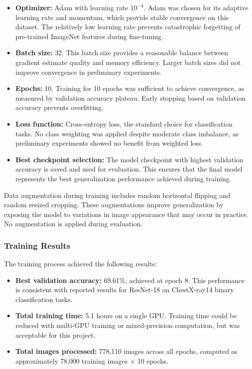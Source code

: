 \documentclass[12pt,a4paper]{article}
\begin{document}
\begin{itemize}[leftmargin=*]
    \item \textbf{Optimizer:} Adam with learning rate $10^{-4}$. Adam was chosen for its adaptive learning rate and momentum, which provide stable convergence on this dataset. The relatively low learning rate prevents catastrophic forgetting of pre-trained ImageNet features during fine-tuning.
    \item \textbf{Batch size:} 32. This batch size provides a reasonable balance between gradient estimate quality and memory efficiency. Larger batch sizes did not improve convergence in preliminary experiments.
    \item \textbf{Epochs:} 10. Training for 10 epochs was sufficient to achieve convergence, as measured by validation accuracy plateau. Early stopping based on validation accuracy prevents overfitting.
    \item \textbf{Loss function:} Cross-entropy loss, the standard choice for classification tasks. No class weighting was applied despite moderate class imbalance, as preliminary experiments showed no benefit from weighted loss.
    \item \textbf{Best checkpoint selection:} The model checkpoint with highest validation accuracy is saved and used for evaluation. This ensures that the final model represents the best generalization performance achieved during training.
\end{itemize}

Data augmentation during training includes random horizontal flipping and random resized cropping. These augmentations improve generalization by exposing the model to variations in image appearance that may occur in practice. No augmentation is applied during evaluation.

\subsubsection{Training Results}

The training process achieved the following results:
\begin{itemize}[leftmargin=*]
    \item \textbf{Best validation accuracy:} 69.61\%, achieved at epoch 8. This performance is consistent with reported results for ResNet-18 on ChestX-ray14 binary classification tasks.
    \item \textbf{Total training time:} 5.1 hours on a single GPU. Training time could be reduced with multi-GPU training or mixed-precision computation, but was acceptable for this project.
    \item \textbf{Total images processed:} 778,110 images across all epochs, computed as approximately 78,000 training images $\times$ 10 epochs.
\end{itemize}
\end{document}
